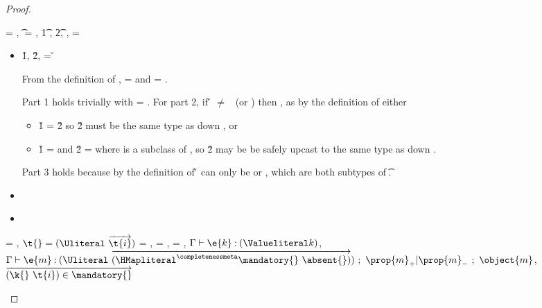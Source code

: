 \begin{lemma}
\begin{proof}
\begin{case}[T-IsA]\e{} = { {}},
  \t{} = {\Boolean{}},
  \judgement {\propenv{}} { {\t{1}}}
             {\filterset {\thenprop {\propp{}}}
                         {\elseprop {\propp{}}}}
                       {},
  \judgementtwo {\propenv{}} { {\t{2}}},
  ,
  \object{} = \emptyobject{}

  \begin{itemize}
    \item[]
      \begin{subcase}[B-IsA]
  \opsem {\openv{}} {} {\v{1}},
  \opsem {\openv{}} {} {\v{2}},
   = {\v{}}

  From the definition of \isacompareliteral,
  \thenprop{\prop{}} = {} and
  \elseprop{\prop{}} = {}.

  Part 1 holds trivially with \object{} = \emptyobject{}.
  For part 2, if \v{} $\not=$ \false\ (or \nil)
  then {}, as by the definition
  of \isaopsemliteral either 
  \begin{itemize}
    \item \v{1} = \v{2} so {\v{2}} must be the same type as down {}, or
    \item \v{1} =  and \v{2} =  where 
  is a subclass of , so {\v{2}} may be be safely upcast to the same type as down {}.
  \end{itemize}
  Part 3 holds because by the definition of \isaopsemliteral
  \v{} can only be \true or \false, which are both subtypes of
  \t{}.


      \end{subcase}
    \item[]
      \begin{subcase}[BE-IsA1]
      \end{subcase}
    \item[]
      \begin{subcase}[BE-IsA2]
      \end{subcase}
  \end{itemize}
\end{case}

\begin{case}[T-GetHMap]
  \e{} = { {}},
  $\t{} = {\Unionsplice {\overrightarrow {\t{i}}}}$
  \thenprop{\prop{}} = {\topprop{}},
  \elseprop{\prop{}} = {\topprop{}},
  \object{} = {
                          {}
                          {\x{}}},
  $\judgementtwo {\propenv{}} {\hastype {\e{k}} {\Value {k}}}$,
  $\judgement {\propenv{}} {\hastype {\e{m}} {\Unionsplice {\overrightarrow {\HMapgeneric {\mandatory{}} {\absent{}}}}}}
           {\filterset {\thenprop {\prop{m}}} {\elseprop {\prop{m}}}}
           {\object{m}}$,
  $\overrightarrow{\inmandatory{\k{}}{\t{i}}{\mandatory{}}}$



\end{case}
\end{proof}
\end{lemma}
